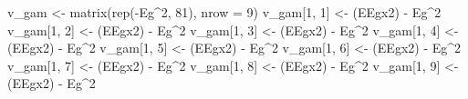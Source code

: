 \documentclass[
  letterpaper,
  DIV=11,
  numbers=noendperiod]{scrartcl}
\newenvironment{Shaded}{\begin{snugshade}}{\end{snugshade}}
\newcommand{\AttributeTok}[1]{\textcolor[rgb]{0.40,0.45,0.13}{#1}}
\newcommand{\DecValTok}[1]{\textcolor[rgb]{0.68,0.00,0.00}{#1}}
\newcommand{\FunctionTok}[1]{\textcolor[rgb]{0.28,0.35,0.67}{#1}}
\newcommand{\NormalTok}[1]{\textcolor[rgb]{0.00,0.23,0.31}{#1}}
\newcommand{\OtherTok}[1]{\textcolor[rgb]{0.00,0.23,0.31}{#1}}
\newcommand{\SpecialCharTok}[1]{\textcolor[rgb]{0.37,0.37,0.37}{#1}}
\begin{document}
\begin{Shaded}
\begin{Highlighting}[]
\NormalTok{  v\_gam }\OtherTok{\textless{}{-}} \FunctionTok{matrix}\NormalTok{(}\FunctionTok{rep}\NormalTok{(}\SpecialCharTok{{-}}\NormalTok{Eg}\SpecialCharTok{\^{}}\DecValTok{2}\NormalTok{, }\DecValTok{81}\NormalTok{), }\AttributeTok{nrow =} \DecValTok{9}\NormalTok{)}
\NormalTok{  v\_gam[}\DecValTok{1}\NormalTok{, }\DecValTok{1}\NormalTok{] }\OtherTok{\textless{}{-}}\NormalTok{ (EEgx2) }\SpecialCharTok{{-}}\NormalTok{ Eg}\SpecialCharTok{\^{}}\DecValTok{2}
\NormalTok{  v\_gam[}\DecValTok{1}\NormalTok{, }\DecValTok{2}\NormalTok{] }\OtherTok{\textless{}{-}}\NormalTok{ (EEgx2) }\SpecialCharTok{{-}}\NormalTok{ Eg}\SpecialCharTok{\^{}}\DecValTok{2}
\NormalTok{  v\_gam[}\DecValTok{1}\NormalTok{, }\DecValTok{3}\NormalTok{] }\OtherTok{\textless{}{-}}\NormalTok{ (EEgx2) }\SpecialCharTok{{-}}\NormalTok{ Eg}\SpecialCharTok{\^{}}\DecValTok{2}
\NormalTok{  v\_gam[}\DecValTok{1}\NormalTok{, }\DecValTok{4}\NormalTok{] }\OtherTok{\textless{}{-}}\NormalTok{ (EEgx2) }\SpecialCharTok{{-}}\NormalTok{ Eg}\SpecialCharTok{\^{}}\DecValTok{2}
\NormalTok{  v\_gam[}\DecValTok{1}\NormalTok{, }\DecValTok{5}\NormalTok{] }\OtherTok{\textless{}{-}}\NormalTok{ (EEgx2) }\SpecialCharTok{{-}}\NormalTok{ Eg}\SpecialCharTok{\^{}}\DecValTok{2}
\NormalTok{  v\_gam[}\DecValTok{1}\NormalTok{, }\DecValTok{6}\NormalTok{] }\OtherTok{\textless{}{-}}\NormalTok{ (EEgx2) }\SpecialCharTok{{-}}\NormalTok{ Eg}\SpecialCharTok{\^{}}\DecValTok{2}
\NormalTok{  v\_gam[}\DecValTok{1}\NormalTok{, }\DecValTok{7}\NormalTok{] }\OtherTok{\textless{}{-}}\NormalTok{ (EEgx2) }\SpecialCharTok{{-}}\NormalTok{ Eg}\SpecialCharTok{\^{}}\DecValTok{2}
\NormalTok{  v\_gam[}\DecValTok{1}\NormalTok{, }\DecValTok{8}\NormalTok{] }\OtherTok{\textless{}{-}}\NormalTok{ (EEgx2) }\SpecialCharTok{{-}}\NormalTok{ Eg}\SpecialCharTok{\^{}}\DecValTok{2}
\NormalTok{  v\_gam[}\DecValTok{1}\NormalTok{, }\DecValTok{9}\NormalTok{] }\OtherTok{\textless{}{-}}\NormalTok{ (EEgx2) }\SpecialCharTok{{-}}\NormalTok{ Eg}\SpecialCharTok{\^{}}\DecValTok{2}


\end{Highlighting}
\end{Shaded}
\end{document}
